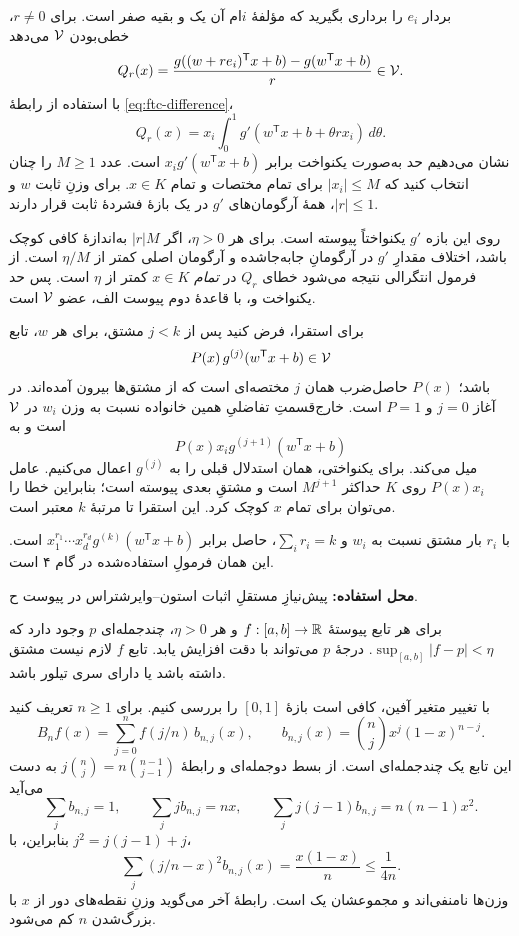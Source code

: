 بردار $e_i$ را برداری بگیرید که مؤلفهٔ $i$ام آن یک و بقیه صفر است. برای $r\neq0$، خطی‌بودن $\mathcal V$ می‌دهد
\[
Q_r(x)=\frac{g((w+re_i)^{\mathsf T}x+b)-g(w^{\mathsf T}x+b)}{r}\in\mathcal V.
\]
با استفاده از رابطهٔ \eqref{eq:ftc-difference}،
\[
Q_r(x)=x_i\int_0^1g'(w^{\mathsf T}x+b+\theta r x_i)\,d\theta.
\]
نشان می‌دهیم حد به‌صورت یکنواخت برابر $x_i g'(w^{\mathsf T}x+b)$ است. عدد $M\geq1$ را چنان انتخاب کنید که $|x_i|\leq M$ برای تمام مختصات و تمام $x\in K$. برای وزنِ ثابت $w$ و $|r|\leq1$، همهٔ آرگومان‌های $g'$ در یک بازهٔ فشردهٔ ثابت قرار دارند.

روی این بازه $g'$ یکنواختاً پیوسته است. برای هر $\eta>0$، اگر $|r|M$ به‌اندازهٔ کافی کوچک باشد، اختلاف مقدارِ $g'$ در آرگومانِ جابه‌جاشده و آرگومان اصلی کمتر از $\eta/M$ است. از فرمول انتگرالی نتیجه می‌شود خطای $Q_r$ در \emph{تمام} $x\in K$ کمتر از $\eta$ است. پس حد یکنواخت و، با قاعدهٔ دوم پیوست الف، عضو $\mathcal V$ است.

برای استقرا، فرض کنید پس از $j<k$ مشتق، برای هر $w$، تابع
\[
P(x)\,g^{(j)}(w^{\mathsf T}x+b)\in\mathcal V
\]
باشد؛ $P(x)$ حاصل‌ضرب همان $j$ مختصه‌ای است که از مشتق‌ها بیرون آمده‌اند. در آغاز $j=0$ و $P=1$ است. خارج‌قسمتِ تفاضلیِ همین خانواده نسبت به وزن $w_i$ در $\mathcal V$ است و به
\[
P(x)x_i g^{(j+1)}(w^{\mathsf T}x+b)
\]
میل می‌کند. برای یکنواختی، همان استدلال قبلی را به $g^{(j)}$ اعمال می‌کنیم. عامل $P(x)x_i$ روی $K$ حداکثر $M^{j+1}$ است و مشتقِ بعدی پیوسته است؛ بنابراین خطا را می‌توان برای تمام $x$ کوچک کرد. این استقرا تا مرتبهٔ $k$ معتبر است.

با $r_i$ بار مشتق نسبت به $w_i$ و $\sum_i r_i=k$، حاصل برابر $x_1^{r_1}\cdots x_d^{r_d}g^{(k)}(w^{\mathsf T}x+b)$ است. این همان فرمولِ استفاده‌شده در گام ۴ است.

\textbf{محل استفاده:} پیش‌نیازِ مستقلِ اثبات استون–وایرشتراس در پیوست ح.

برای هر تابع پیوستهٔ $f:[a,b]\to\mathbb R$ و هر $\eta>0$، چندجمله‌ای $p$ وجود دارد که $\sup_{[a,b]}|f-p|<\eta$. درجهٔ $p$ می‌تواند با دقت افزایش یابد. تابع $f$ لازم نیست مشتق داشته باشد یا دارای سری تیلور باشد.

با تغییر متغیر آفین، کافی است بازهٔ $[0,1]$ را بررسی کنیم. برای $n\geq1$ تعریف کنید
\[
B_nf(x)=\sum_{j=0}^{n}f(j/n)\,b_{n,j}(x),
\qquad b_{n,j}(x)=\binom nj x^j(1-x)^{n-j}.
\]
این تابع یک چندجمله‌ای است. از بسط دوجمله‌ای و رابطهٔ $j\binom nj=n\binom{n-1}{j-1}$ به دست می‌آید
\[
\sum_j b_{n,j}=1,\qquad
\sum_j j b_{n,j}=nx,\qquad
\sum_j j(j-1)b_{n,j}=n(n-1)x^2.
\]
بنابراین، با $j^2=j(j-1)+j$،
\begin{equation}\label{eq:bernstein}
\sum_j (j/n-x)^2b_{n,j}(x)=\frac{x(1-x)}n\leq\frac1{4n}.
\end{equation}
وزن‌ها نامنفی‌اند و مجموعشان یک است. رابطهٔ آخر می‌گوید وزنِ نقطه‌های دور از $x$ با بزرگ‌شدن $n$ کم می‌شود.

